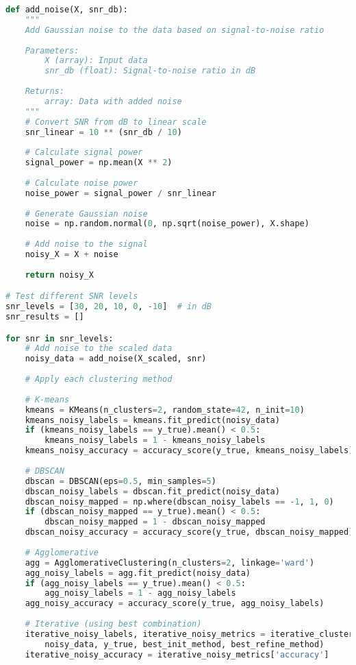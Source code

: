 \begin{lstlisting}[language=Python, caption=SNR Experiment Implementation]
def add_noise(X, snr_db):
    """
    Add Gaussian noise to the data based on signal-to-noise ratio
    
    Parameters:
        X (array): Input data
        snr_db (float): Signal-to-noise ratio in dB
    
    Returns:
        array: Data with added noise
    """
    # Convert SNR from dB to linear scale
    snr_linear = 10 ** (snr_db / 10)
    
    # Calculate signal power
    signal_power = np.mean(X ** 2)
    
    # Calculate noise power
    noise_power = signal_power / snr_linear
    
    # Generate Gaussian noise
    noise = np.random.normal(0, np.sqrt(noise_power), X.shape)
    
    # Add noise to the signal
    noisy_X = X + noise
    
    return noisy_X

# Test different SNR levels
snr_levels = [30, 20, 10, 0, -10]  # in dB
snr_results = []

for snr in snr_levels:
    # Add noise to the scaled data
    noisy_data = add_noise(X_scaled, snr)
    
    # Apply each clustering method
    
    # K-means
    kmeans = KMeans(n_clusters=2, random_state=42, n_init=10)
    kmeans_noisy_labels = kmeans.fit_predict(noisy_data)
    if (kmeans_noisy_labels == y_true).mean() < 0.5:
        kmeans_noisy_labels = 1 - kmeans_noisy_labels
    kmeans_noisy_accuracy = accuracy_score(y_true, kmeans_noisy_labels)
    
    # DBSCAN
    dbscan = DBSCAN(eps=0.5, min_samples=5)
    dbscan_noisy_labels = dbscan.fit_predict(noisy_data)
    dbscan_noisy_mapped = np.where(dbscan_noisy_labels == -1, 1, 0)
    if (dbscan_noisy_mapped == y_true).mean() < 0.5:
        dbscan_noisy_mapped = 1 - dbscan_noisy_mapped
    dbscan_noisy_accuracy = accuracy_score(y_true, dbscan_noisy_mapped)
    
    # Agglomerative
    agg = AgglomerativeClustering(n_clusters=2, linkage='ward')
    agg_noisy_labels = agg.fit_predict(noisy_data)
    if (agg_noisy_labels == y_true).mean() < 0.5:
        agg_noisy_labels = 1 - agg_noisy_labels
    agg_noisy_accuracy = accuracy_score(y_true, agg_noisy_labels)
    
    # Iterative (using best combination)
    iterative_noisy_labels, iterative_noisy_metrics = iterative_clustering(
        noisy_data, y_true, best_init_method, best_refine_method)
    iterative_noisy_accuracy = iterative_noisy_metrics['accuracy']
    

\end{lstlisting}
